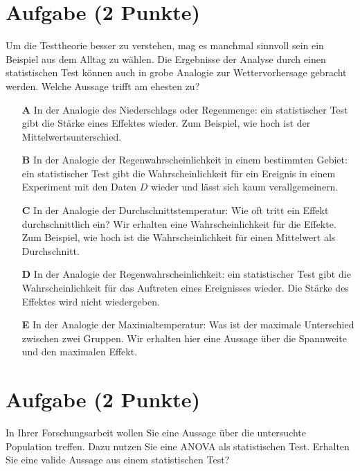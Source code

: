 \documentclass[a4paper, 9pt]{scrartcl}\usepackage[]{graphicx}\usepackage[]{xcolor}
\begin{document}
\section{Aufgabe \hfill (2 Punkte)}



Um die Testtheorie besser zu verstehen, mag es manchmal sinnvoll sein ein Beispiel aus dem Alltag zu wählen. Die Ergebnisse der Analyse durch einen statistischen Test können auch in grobe Analogie zur Wettervorhersage gebracht werden. Welche Aussage trifft am ehesten zu?



\begin{enumerate}
\item [\textbf{A} \msquare] In der Analogie des Niederschlags oder Regenmenge: ein statistischer Test gibt die Stärke eines Effektes wieder. Zum Beispiel, wie hoch ist der Mittelwertsunterschied.
\item [\textbf{B} \msquare] In der Analogie der Regenwahrscheinlichkeit in einem bestimmten Gebiet: ein statistischer Test gibt die Wahrscheinlichkeit für ein Ereignis in einem Experiment mit den Daten $D$ wieder und lässt sich kaum verallgemeinern.
\item [\textbf{C} \msquare] In der Analogie der Durchschnittstemperatur: Wie oft tritt ein Effekt durchschnittlich ein? Wir erhalten eine Wahrscheinlichkeit für die Effekte. Zum Beispiel, wie hoch ist die Wahrscheinlichkeit für einen Mittelwert als Durchschnitt.
\item [\textbf{D} \msquare] In der Analogie der Regenwahrscheinlichkeit: ein statistischer Test gibt die Wahrscheinlichkeit für das Auftreten eines Ereignisses wieder. Die Stärke des Effektes wird nicht wiedergeben.
\item [\textbf{E} \msquare] In der Analogie der Maximaltemperatur: Was ist der maximale Unterschied zwischen zwei Gruppen. Wir erhalten hier eine Aussage über die Spannweite und den maximalen Effekt.
\end{enumerate}

\section{Aufgabe \hfill (2 Punkte)}



In Ihrer Forschungsarbeit wollen Sie eine Aussage über die untersuchte Population treffen. Dazu nutzen Sie eine ANOVA als statistischen Test. Erhalten Sie eine valide Aussage aus einem statistischen Test?
\end{document}
